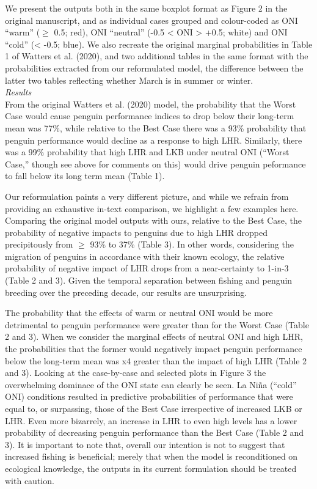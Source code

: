 \documentclass[]{elsarticle} %
\begin{document}
We present the outputs both in the same boxplot format as Figure 2 in
the original manuscript, and as individual cases grouped and
colour-coded as ONI ``warm'' (\(\geqslant\) 0.5; red), ONI ``neutral''
(-0.5 \textless{} ONI \textgreater{} +0.5; white) and ONI ``cold''
(\textless{} -0.5; blue). We also recreate the original marginal
probabilities in Table 1 of Watters et al. (2020), and two additional
tables in the same format with the probabilities extracted from our
reformulated model, the difference between the latter two tables
reflecting whether March is in summer or winter.\\
\newline   \emph{Results}\\
From the original Watters et al. (2020) model, the probability that the
Worst Case would cause penguin performance indices to drop below their
long-term mean was 77\%, while relative to the Best Case there was a
93\% probability that penguin performance would decline as a response to
high LHR. Similarly, there was a 99\% probability that high LHR and LKB
under neutral ONI (``Worst Case,'' though see above for comments on
this) would drive penguin peformance to fall below its long term mean
(Table 1).

Our reformulation paints a very different picture, and while we refrain
from providing an exhaustive in-text comparison, we highlight a few
examples here. Comparing the original model outputs with ours, relative
to the Best Case, the probability of negative impacts to penguins due to
high LHR dropped precipitously from \(\geqslant\) 93\% to 37\% (Table
3). In other words, considering the migration of penguins in accordance
with their known ecology, the relative probability of negative impact of
LHR drops from a near-certainty to 1-in-3 (Table 2 and 3). Given the
temporal separation between fishing and penguin breeding over the
preceding decade, our results are unsurprising.

The probability that the effects of warm or neutral ONI would be more
detrimental to penguin performance were greater than for the Worst Case
(Table 2 and 3). When we consider the marginal effects of neutral ONI
and high LHR, the probabilities that the former would negatively impact
penguin performance below the long-term mean was x4 greater than the
impact of high LHR (Table 2 and 3). Looking at the case-by-case and
selected plots in Figure 3 the overwhelming dominace of the ONI state
can clearly be seen. La Niña (``cold'' ONI) conditions resulted in
predictive probabilities of performance that were equal to, or
surpassing, those of the Best Case irrespective of increased LKB or LHR.
Even more bizarrely, an increase in LHR to even high levels has a lower
probability of decreasing penguin performance than the Best Case (Table
2 and 3). It is important to note that, overall our intention is not to
suggest that increased fishing is beneficial; merely that when the model
is reconditioned on ecological knowledge, the outputs in its current
formulation should be treated with caution.
\end{document}
